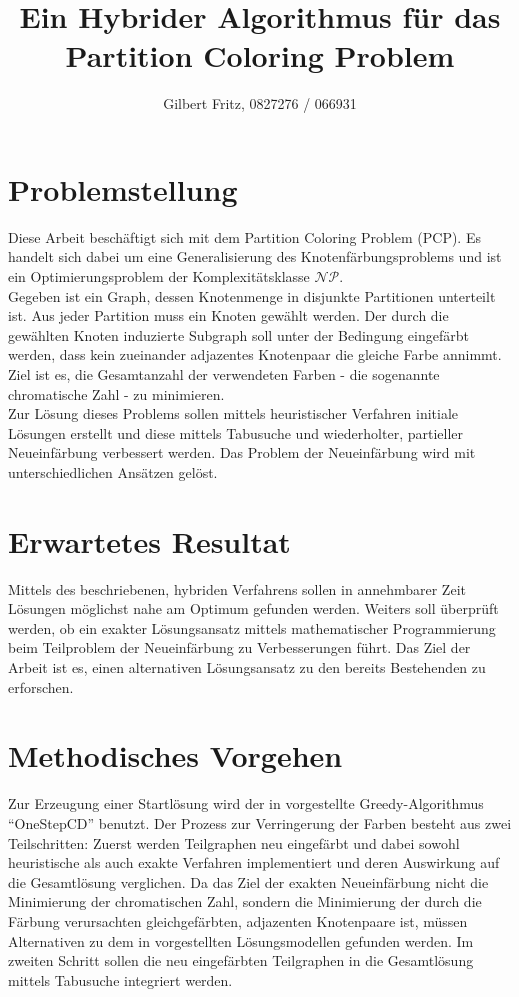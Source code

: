\documentclass{article}
\title{Ein Hybrider Algorithmus für das Partition Coloring Problem}
\author{Gilbert Fritz, 0827276 / 066931}
\begin{document}
\maketitle
\nocite{li-00}

\section{Problemstellung}

Diese Arbeit beschäftigt sich mit dem Partition Coloring Problem (PCP). Es handelt sich dabei um eine Generalisierung des Knotenfärbungsproblems und ist ein Optimierungsproblem der Komplexitätsklasse $\mathcal{NP}$.\\
Gegeben ist ein Graph, dessen Knotenmenge in disjunkte Partitionen unterteilt ist. Aus jeder Partition muss ein Knoten gewählt werden. Der durch die gewählten Knoten induzierte Subgraph soll unter der Bedingung eingefärbt werden, dass kein zueinander adjazentes Knotenpaar die gleiche Farbe annimmt. Ziel ist es, die Gesamtanzahl der verwendeten Farben - die sogenannte chromatische Zahl - zu minimieren.\\
Zur Lösung dieses Problems sollen mittels heuristischer Verfahren initiale Lösun\-gen erstellt und diese mittels Tabusuche und wiederholter, partieller Neueinfär\-bung verbessert werden. Das Problem der Neueinfärbung wird mit unterschiedlichen Ansätzen gelöst. 

\section{Erwartetes Resultat}

Mittels des beschriebenen, hybriden Verfahrens sollen in annehmbarer Zeit Lösun\-gen möglichst nahe am Optimum gefunden werden. Weiters soll überprüft werden, ob ein exakter Lösungsansatz mittels mathematischer Programmierung beim Teilproblem der Neueinfärbung zu Verbesserungen führt. Das Ziel der Arbeit ist es, einen alternativen Lösungsansatz zu den bereits Bestehenden zu erforschen.


\section{Methodisches Vorgehen}

Zur Erzeugung einer Startlösung wird der in \cite{li-00} vorgestellte Greedy-Algorithmus ``OneStepCD'' benutzt. Der Prozess zur Verringerung der Farben besteht aus zwei Teilschritten: Zuerst werden Teilgraphen neu eingefärbt und dabei sowohl heuristische als auch exakte Verfahren implementiert und deren Auswirkung auf die Gesamtlösung verglichen. Da das Ziel der exakten Neueinfärbung nicht die Minimierung der chromatischen Zahl, sondern die Minimierung der durch die Färbung verursachten gleichgefärbten, adjazenten Knotenpaare ist, müssen Alternativen zu dem in \cite{frota-07} vorgestellten Lösungsmodellen gefunden werden. Im zweiten Schritt sollen die neu eingefärbten Teilgraphen in die Gesamtlösung mittels Tabusuche integriert werden.
\end{document}
